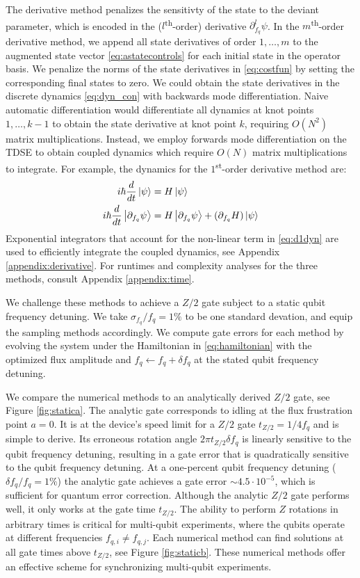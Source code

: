 The derivative method penalizes the sensitivty of the state
to the deviant parameter, which is encoded in the ($l$\textsuperscript{th}-order)
derivative $\partial_{f_{q}}^{l} \psi$. In the $m$\textsuperscript{th}-order
derivative method, we append all state derivatives of order $1, \dots, m$
to the augmented state vector \eqref{eq:astatecontrols}
for each initial state in the operator basis.
We penalize the norms of the state derivatives
in \eqref{eq:costfun} by setting the corresponding final states to zero.
We could obtain the state derivatives in the discrete dynamics \eqref{eq:dyn_con}
with backwards mode differentiation.
Naive automatic differentiation 
would differentiate all dynamics at knot points
$1, \dots, k - 1$ to obtain the state derivative at knot point $k$, requiring
$O(N^{2})$ matrix multiplications. Instead, we 
employ forwards mode differentiation on the TDSE to obtain coupled dynamics
which require $O(N)$ matrix multiplications to integrate.
For example, the dynamics for the $1$\textsuperscript{st}-order derivative method are:
\begin{align}
  i \hbar \frac{d}{dt} \ket{\psi} &= H \ket{\psi}\\
  i \hbar \frac{d}{dt} \ket{\partial_{f_{q}}\psi} &=
  H \ket{\partial_{f_{q}} \psi} +
  (\partial_{f_{q}} H) \ket{\psi}
  \label{eq:d1dyn}
\end{align}
Exponential integrators that account for the non-linear
term in \eqref{eq:d1dyn} are used to efficiently integrate the coupled dynamics,
see Appendix \ref{appendix:derivative}. For runtimes
and complexity analyses for the three methods,
consult Appendix \ref{appendix:time}.

We challenge these methods to achieve
a $Z/2$ gate subject to a static qubit frequency detuning.
We take $\sigma_{f_{q}} / f_{q} = 1\%$ to be one standard devation, and equip
the sampling methods accordingly. We compute gate errors for each method
by evolving the system under the Hamiltonian in \eqref{eq:hamiltonian}
with the optimized flux amplitude and $f_{q} \gets f_{q} + \delta f_{q}$
at the stated qubit frequency detuning.

We compare the numerical methods
to an analytically derived $Z/2$ gate, see Figure \ref{fig:statica}. 
The analytic gate corresponds to
idling at the flux frustration point $a = 0$. It
is at the device's speed limit for a $Z/2$ gate $t_{Z/2} = 1 / 4 f_{q}$ and
is simple to derive. Its erroneous rotation angle
$2 \pi t_{Z/2} \delta f_{q}$ is linearly sensitive to
the qubit frequency detuning, resulting in a gate error that is quadratically sensitive
to the qubit frequency detuning.
At a one-percent
qubit frequency detuning ($\delta f_{q} / f_{q} = 1\%$)
the analytic gate achieves a gate error $\sim 4.5 \cdot 10^{-5}$,
which is sufficient for quantum error correction.
Although the analytic $Z/2$ gate performs well, it
only works at the gate time $t_{Z/2}$. The ability to perform $Z$
rotations in arbitrary times is critical
for multi-qubit experiments, where the qubits operate at different
frequencies $f_{q, i} \neq f_{q, j}$.
Each numerical method can find solutions at
all gate times above $t_{Z/2}$, see Figure \ref{fig:staticb}.
These numerical methods offer an effective scheme for synchronizing
multi-qubit experiments.

